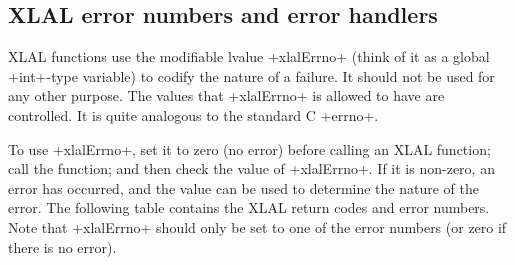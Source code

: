 \documentclass[10pt]{ligodcc}
\makeatletter
\def\verb{\relax\ifmmode\hbox\else\leavevmode\null\fi
  \bgroup
    \color{blue}\small
    \verb@eol@error \let\do\@makeother \dospecials
    \verbatim@font\@noligs
    \@ifstar\@sverb\@verb}
\makeatother
\begin{document}
\subsection{XLAL error numbers and error handlers}

XLAL functions use the modifiable lvalue \verb+xlalErrno+ (think of it as 
a global \verb+int+-type variable) to codify the nature of a failure.  It
should not be used for any other purpose.  The values that \verb+xlalErrno+
is allowed to have are controlled.  It is quite analogous to the standard 
C \verb+errno+.

To use \verb+xlalErrno+, set it to zero (no error) before calling an XLAL
function; call the function; and then check the value of \verb+xlalErrno+.
If it is non-zero, an error has occurred, and the value can be used to
determine the nature of the error.  The following table contains the XLAL
return codes and error numbers.  Note that \verb+xlalErrno+ should only be
set to one of the error numbers (or zero if there is no error).
\end{document}
